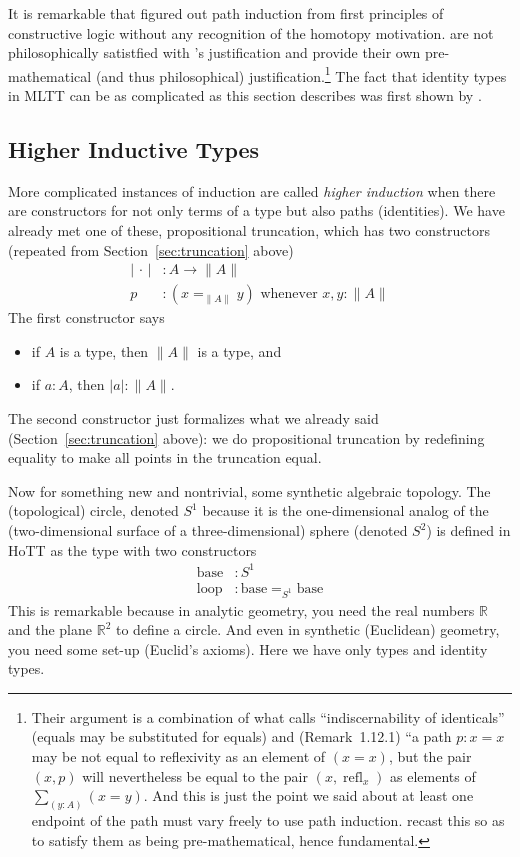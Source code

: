 \documentclass[11pt]{article}
\DeclareMathOperator{\refl}{refl}
\newcommand{\sloop}{\text{loop}}
\newcommand{\sbase}{\text{base}}
\newcommand{\proptrunc}[1]{\lVert #1 \rVert}
\newcommand{\termtrunc}[1]{\lvert #1 \rvert}
\newcommand{\real}{\mathbb{R}}
\newcommand{\fatdot}{\,\cdot\,}
\begin{document}
It is remarkable that \citet{martin-lof-mltt} figured out path induction
from first principles of constructive logic without any recognition of
the homotopy motivation.  \citet{ladyman-presnell} are not philosophically
satistfied with \citeauthor{martin-lof-mltt}'s justification and provide
their own pre-mathematical (and thus philosophical)
justification.\footnote{Their argument is a combination of what
 calls ``indiscernability of identicals''
(equals may be substituted for equals) and (Remark~1.12.1) ``a path
$p : x = x$ may be not equal to reflexivity as an element of $( x = x )$,
but the pair $(x, p)$ will nevertheless be equal to the pair $(x, \refl_x)$
as elements of $\sum_{(y:A)} (x = y)$.  And this is just the point we said
about at least one endpoint of the path must vary freely to use path induction.
\citeauthor{ladyman-presnell} recast this so as to satisfy them as being
pre-mathematical, hence fundamental.}
The fact that identity types in MLTT can be as complicated as this
section describes was first shown by \citet{hofmann-streicher}.

\subsection{Higher Inductive Types}
\label{sec:higher-induction}

More complicated instances of induction are called \emph{higher induction}
when there are constructors for not only terms of a type but also paths
(identities).   We have already met one of these, propositional truncation,
which has two constructors (repeated from Section~\ref{sec:truncation} above)
\begin{align*}
   \termtrunc{\fatdot} & : A \to \proptrunc{A}
   \\
   p & : \text{$(x =_{\proptrunc{A}} y)$ whenever $x, y : \proptrunc{A}$}
\end{align*}
The first constructor says\
\begin{itemize}
\item if $A$ is a type, then $\proptrunc{A}$ is a type, and
\item if $a : A$, then $\termtrunc{a} : \proptrunc{A}$.
\end{itemize}
The second constructor just formalizes what we already said
(Section~\ref{sec:truncation} above):
we do propositional truncation by redefining
equality to make all points in the truncation equal.

Now for something new and nontrivial, some synthetic algebraic topology.
The (topological) circle, denoted $S^1$ because it is the one-dimensional
analog of the (two-dimensional surface of a three-dimensional) sphere
(denoted $S^2$) is defined in HoTT as the type with two constructors
\begin{align*}
   \sbase & : S^1
   \\
   \sloop & : \sbase =_{S^1} \sbase
\end{align*}
This is remarkable because in analytic geometry, you need the real numbers
$\real$ and the plane $\real^2$ to define a circle.  And even in synthetic
(Euclidean) geometry, you need some set-up (Euclid's axioms).
Here we have only types and identity types.
\end{document}
